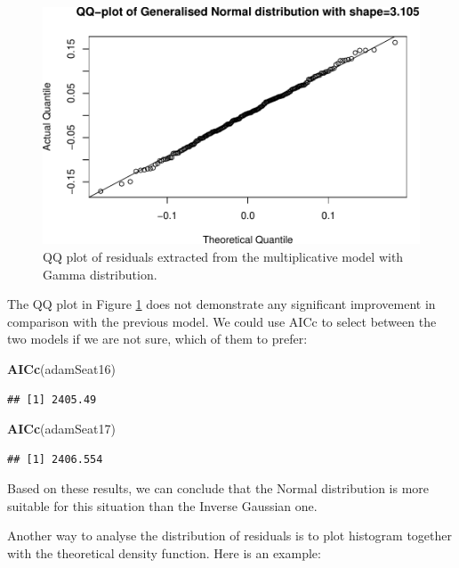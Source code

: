 \documentclass[]{book}
\newenvironment{Shaded}{\begin{snugshade}}{\end{snugshade}}
\newcommand{\KeywordTok}[1]{\textcolor[rgb]{0.13,0.29,0.53}{\textbf{#1}}}
\newcommand{\NormalTok}[1]{#1}
\theoremstyle{definition}
\theoremstyle{definition}
\theoremstyle{definition}
\theoremstyle{definition}
\theoremstyle{remark}
\begin{document}
\begin{figure}
\centering
\includegraphics{Svetunkov--2022----ADAM_files/figure-latex/adamSeat17QQ-1.pdf}
\caption{\label{fig:adamSeat17QQ}QQ plot of residuals extracted from the multiplicative model with Gamma distribution.}
\end{figure}

The QQ plot in Figure \ref{fig:adamSeat17QQ} does not demonstrate any significant improvement in comparison with the previous model. We could use AICc to select between the two models if we are not sure, which of them to prefer:

\begin{Shaded}
\begin{Highlighting}[]
\KeywordTok{AICc}\NormalTok{(adamSeat16)}
\end{Highlighting}
\end{Shaded}

\begin{verbatim}
## [1] 2405.49
\end{verbatim}

\begin{Shaded}
\begin{Highlighting}[]
\KeywordTok{AICc}\NormalTok{(adamSeat17)}
\end{Highlighting}
\end{Shaded}

\begin{verbatim}
## [1] 2406.554
\end{verbatim}

Based on these results, we can conclude that the Normal distribution is more suitable for this situation than the Inverse Gaussian one.

Another way to analyse the distribution of residuals is to plot histogram together with the theoretical density function. Here is an example:
\end{document}
